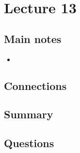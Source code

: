 \section{Lecture 13}

\subsection{Main notes}


\begin{itemize}
	\item
\end{itemize}


\subsection{Connections}


\subsection{Summary}


\subsection{Questions}
